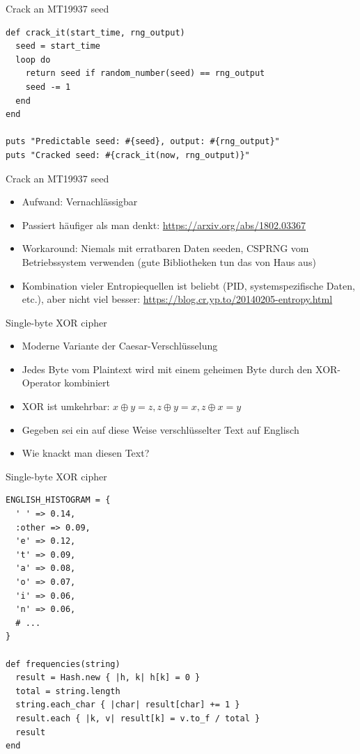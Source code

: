 \documentclass[presentation]{beamer}
\begin{document}
\begin{frame}[fragile,label={sec:org5973096}]{Crack an MT19937 seed}
 \begin{verbatim}
def crack_it(start_time, rng_output)
  seed = start_time
  loop do
    return seed if random_number(seed) == rng_output
    seed -= 1
  end
end

puts "Predictable seed: #{seed}, output: #{rng_output}"
puts "Cracked seed: #{crack_it(now, rng_output)}"
\end{verbatim}
\end{frame}

\begin{frame}[label={sec:org5c04737}]{Crack an MT19937 seed}
\begin{itemize}
\item Aufwand: Vernachlässigbar
\item Passiert häufiger als man denkt: \url{https://arxiv.org/abs/1802.03367}
\item Workaround: Niemals mit erratbaren Daten seeden, CSPRNG vom
Betriebssystem verwenden (gute Bibliotheken tun das von Haus aus)
\item Kombination vieler Entropiequellen ist beliebt (PID,
systemspezifische Daten, etc.), aber nicht viel besser:
\url{https://blog.cr.yp.to/20140205-entropy.html}
\end{itemize}
\end{frame}

\begin{frame}[label={sec:org0733f6b}]{Single-byte XOR cipher}
\begin{itemize}
\item Moderne Variante der Caesar-Verschlüsselung
\item Jedes Byte vom Plaintext wird mit einem geheimen Byte durch den
XOR-Operator kombiniert
\item XOR ist umkehrbar: \(x \oplus y = z, z \oplus y = x, z \oplus x = y\)
\item Gegeben sei ein auf diese Weise verschlüsselter Text auf Englisch
\item Wie knackt man diesen Text?
\end{itemize}
\end{frame}

\begin{frame}[fragile,label={sec:org4801c6f}]{Single-byte XOR cipher}
 \begin{verbatim}
ENGLISH_HISTOGRAM = {
  ' ' => 0.14,
  :other => 0.09,
  'e' => 0.12,
  't' => 0.09,
  'a' => 0.08,
  'o' => 0.07,
  'i' => 0.06,
  'n' => 0.06,
  # ...
}

def frequencies(string)
  result = Hash.new { |h, k| h[k] = 0 }
  total = string.length
  string.each_char { |char| result[char] += 1 }
  result.each { |k, v| result[k] = v.to_f / total }
  result
end
\end{verbatim}
\end{frame}
\end{document}
